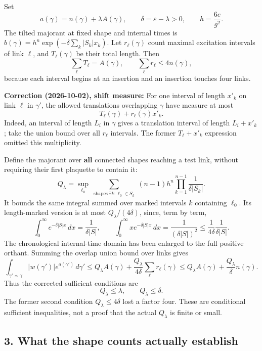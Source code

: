 \documentclass[11pt,a4paper]{article}
\begin{document}
Set \[a(\gamma)=n(\gamma)+\lambda A(\gamma),\qquad
\delta=\varepsilon-\lambda>0,\qquad h=\frac{6e}{g^2}.\] The tilted
majorant at fixed shape and internal times is
\(b(\gamma)=h^n\exp(-\delta\sum_k|S_k|x_k)\). Let \(r_\ell(\gamma)\)
count maximal excitation intervals of link \(\ell\), and
\(T_\ell(\gamma)\) be their total length. Then
\[\sum_\ell T_\ell=A(\gamma),\qquad \sum_\ell r_\ell\le4n(\gamma),\]
because each interval begins at an insertion and an insertion touches
four links.

\textbf{Correction (2026-10-02), shift measure:} For one interval of
length \(x'_k\) on link \(\ell\) in \(\gamma'\), the allowed
translations overlapping \(\gamma\) have measure at most
\[T_\ell(\gamma)+r_\ell(\gamma)x'_k.\] Indeed, an interval of length
\(L_i\) in \(\gamma\) gives a translation interval of length
\(L_i+x'_k\); take the union bound over all \(r_\ell\) intervals. The
former \(T_\ell+x'_k\) expression omitted this multiplicity.

Define the majorant over \textbf{all} connected shapes reaching a test
link, without requiring their first plaquette to contain it:
\[Q_\lambda=\sup_{\ell_0}\sum_{\substack{\text{shapes}\ \exists k:\ell_0\in S_k}}
(n-1)h^n\prod_{k=1}^{n-1}\frac1{\delta|S_k|}.\] It bounds the same
integral summed over marked intervals \(k\) containing \(\ell_0\). Its
length-marked version is at most \(Q_\lambda/(4\delta)\), since, term by
term, \[\int_0^\infty e^{-\delta|S|x}\,dx=\frac1{\delta|S|},\qquad
\int_0^\infty x e^{-\delta|S|x}\,dx
=\frac1{(\delta|S|)^2}\le\frac1{4\delta}\frac1{\delta|S|}.\] The
chronological internal-time domain has been enlarged to the full
positive orthant. Summing the overlap union bound over links gives
\[\int_{\gamma'\not\sim\gamma}|w(\gamma')|e^{a(\gamma')}\,d\gamma'
\le Q_\lambda A(\gamma)+\frac{Q_\lambda}{4\delta}\sum_\ell r_\ell(\gamma)
\le Q_\lambda A(\gamma)+\frac{Q_\lambda}{\delta}n(\gamma).\] Thus the
corrected sufficient conditions are
\[Q_\lambda\le\lambda,\qquad Q_\lambda\le\delta.\] The former second
condition \(Q_\lambda\le4\delta\) lost a factor four. These are
conditional sufficient inequalities, not a proof that the actual
\(Q_\lambda\) is finite or small.

\hypertarget{what-the-shape-counts-actually-establish}{%
\subsection{3. What the shape counts actually
establish}\label{what-the-shape-counts-actually-establish}}
\end{document}
